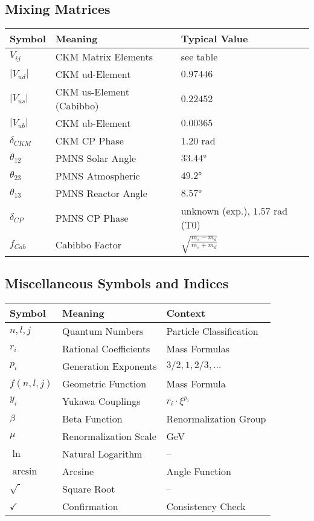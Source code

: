 \documentclass[12pt,a4paper]{article}
\begin{document}
	\subsection{Mixing Matrices}
	
	\begin{longtable}{lll}
		\toprule
		\textbf{Symbol} & \textbf{Meaning} & \textbf{Typical Value} \\
		\midrule
		$V_{ij}$ & CKM Matrix Elements & see table \\
		$|V_{ud}|$ & CKM ud-Element & $0.97446$ \\
		$|V_{us}|$ & CKM us-Element (Cabibbo) & $0.22452$ \\
		$|V_{ub}|$ & CKM ub-Element & $0.00365$ \\
		$\delta_{CKM}$ & CKM CP Phase & $1.20$ rad \\
		$\theta_{12}$ & PMNS Solar Angle & $33.44°$ \\
		$\theta_{23}$ & PMNS Atmospheric & $49.2°$ \\
		$\theta_{13}$ & PMNS Reactor Angle & $8.57°$ \\
		$\delta_{CP}$ & PMNS CP Phase & unknown (exp.), $1.57$ rad (T0) \\
		$f_{Cab}$ & Cabibbo Factor & $\sqrt{\frac{m_s - m_d}{m_s + m_d}}$ \\
		\bottomrule
	\end{longtable}
	
	\subsection{Miscellaneous Symbols and Indices}
	
	\begin{longtable}{lll}
		\toprule
		\textbf{Symbol} & \textbf{Meaning} & \textbf{Context} \\
		\midrule
		$n, l, j$ & Quantum Numbers & Particle Classification \\
		$r_i$ & Rational Coefficients & Mass Formulas \\
		$p_i$ & Generation Exponents & $3/2, 1, 2/3, ...$ \\
		$f(n,l,j)$ & Geometric Function & Mass Formula \\
		$y_i$ & Yukawa Couplings & $r_i \cdot \xi^{p_i}$ \\
		$\beta$ & Beta Function & Renormalization Group \\
		$\mu$ & Renormalization Scale & GeV \\
		$\ln$ & Natural Logarithm & -- \\
		$\arcsin$ & Arcsine & Angle Function \\
		$\sqrt{\ }$ & Square Root & -- \\
		$\checkmark$ & Confirmation & Consistency Check \\
		\bottomrule
	\end{longtable}
	
\end{document}
